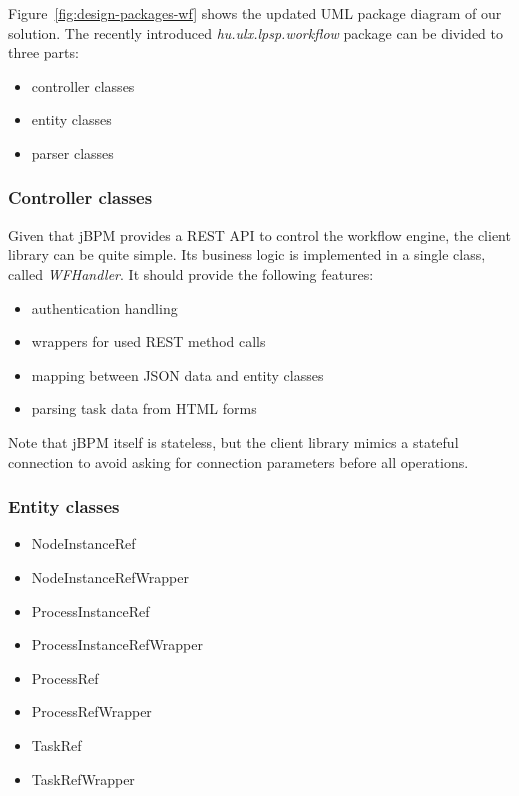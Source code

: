 Figure~\ref{fig:design-packages-wf} shows the updated UML package diagram of our
solution. The recently introduced \emph{hu.ulx.lpsp.workflow} package can be divided to three
parts:

\begin{itemize}
\item controller classes
\item entity classes
\item parser classes
\end{itemize}

\subsubsection*{Controller classes}

Given that jBPM provides a REST API to control the workflow engine, the client
library can be quite simple. Its business logic is implemented in a single
class, called \emph{WFHandler}. It should provide the following features:

\begin{itemize}
\item authentication handling
\item wrappers for used REST method calls
\item mapping between JSON data and entity classes
\item parsing task data from HTML forms
\end{itemize}

Note that jBPM itself is stateless, but the client library mimics a stateful
connection to avoid asking for connection parameters before all operations.

\subsubsection*{Entity classes}

\begin{itemize}
\item NodeInstanceRef
\item NodeInstanceRefWrapper
\item ProcessInstanceRef
\item ProcessInstanceRefWrapper
\item ProcessRef
\item ProcessRefWrapper
\item TaskRef
\item TaskRefWrapper
\end{itemize}

